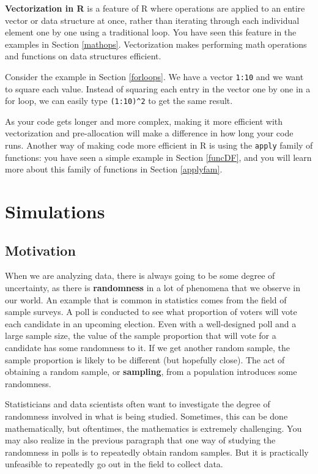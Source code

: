 \documentclass[
]{book}
\theoremstyle{definition}
\theoremstyle{definition}
\theoremstyle{definition}
\theoremstyle{definition}
\theoremstyle{remark}
\begin{document}
\textbf{Vectorization in R} is a feature of R where operations are applied to an entire vector or data structure at once, rather than iterating through each individual element one by one using a traditional loop. You have seen this feature in the examples in Section \ref{mathops}. Vectorization makes performing math operations and functions on data structures efficient.

Consider the example in Section \ref{forloops}. We have a vector \texttt{1:10} and we want to square each value. Instead of squaring each entry in the vector one by one in a for loop, we can easily type \texttt{(1:10)\^{}2} to get the same result.

As your code gets longer and more complex, making it more efficient with vectorization and pre-allocation will make a difference in how long your code runs. Another way of making code more efficient in R is using the \texttt{apply} family of functions: you have seen a simple example in Section \ref{funcDF}, and you will learn more about this family of functions in Section \ref{applyfam}.

\hypertarget{sims}{%
\chapter{Simulations}\label{sims}}

\hypertarget{motivation-3}{%
\section{Motivation}\label{motivation-3}}

When we are analyzing data, there is always going to be some degree of uncertainty, as there is \textbf{randomness} in a lot of phenomena that we observe in our world. An example that is common in statistics comes from the field of sample surveys. A poll is conducted to see what proportion of voters will vote each candidate in an upcoming election. Even with a well-designed poll and a large sample size, the value of the sample proportion that will vote for a candidate has some randomness to it. If we get another random sample, the sample proportion is likely to be different (but hopefully close). The act of obtaining a random sample, or \textbf{sampling}, from a population introduces some randomness.

Statisticians and data scientists often want to investigate the degree of randomness involved in what is being studied. Sometimes, this can be done mathematically, but oftentimes, the mathematics is extremely challenging. You may also realize in the previous paragraph that one way of studying the randomness in polls is to repeatedly obtain random samples. But it is practically unfeasible to repeatedly go out in the field to collect data.
\end{document}
